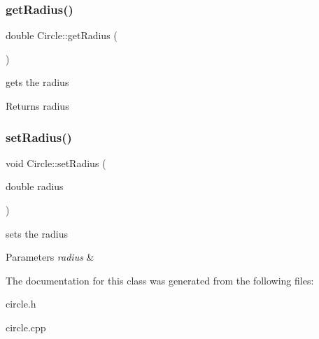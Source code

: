 \subsubsection{\texorpdfstring{get\+Radius()}{getRadius()}}
{\footnotesize\ttfamily double Circle\+::get\+Radius (\begin{DoxyParamCaption}{ }\end{DoxyParamCaption})}



gets the radius 

\begin{DoxyReturn}{Returns}
radius 
\end{DoxyReturn}
\mbox{\label{classCircle_a7a1b334833a9f468498c804264553f41}} 
\subsubsection{\texorpdfstring{set\+Radius()}{setRadius()}}
{\footnotesize\ttfamily void Circle\+::set\+Radius (\begin{DoxyParamCaption}\item[{double}]{radius }\end{DoxyParamCaption})}



sets the radius 


\begin{DoxyParams}{Parameters}
{\em radius} & \\
\hline
\end{DoxyParams}


The documentation for this class was generated from the following files\+:\begin{DoxyCompactItemize}
\item 
circle.\+h\item 
circle.\+cpp\end{DoxyCompactItemize}
